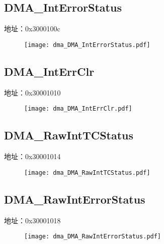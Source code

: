 \subsection{DMA\_IntErrorStatus}
\label{dma-DMA-IntErrorStatus}
地址：0x3000100c
 \begin{figure}[H]
\texttt{[image: dma\_DMA\_IntErrorStatus.pdf]}
\end{figure}

\subsection{DMA\_IntErrClr}
\label{dma-DMA-IntErrClr}
地址：0x30001010
 \begin{figure}[H]
\texttt{[image: dma\_DMA\_IntErrClr.pdf]}
\end{figure}

\subsection{DMA\_RawIntTCStatus}
\label{dma-DMA-RawIntTCStatus}
地址：0x30001014
 \begin{figure}[H]
\texttt{[image: dma\_DMA\_RawIntTCStatus.pdf]}
\end{figure}

\subsection{DMA\_RawIntErrorStatus}
\label{dma-DMA-RawIntErrorStatus}
地址：0x30001018
 \begin{figure}[H]
\texttt{[image: dma\_DMA\_RawIntErrorStatus.pdf]}
\end{figure}

